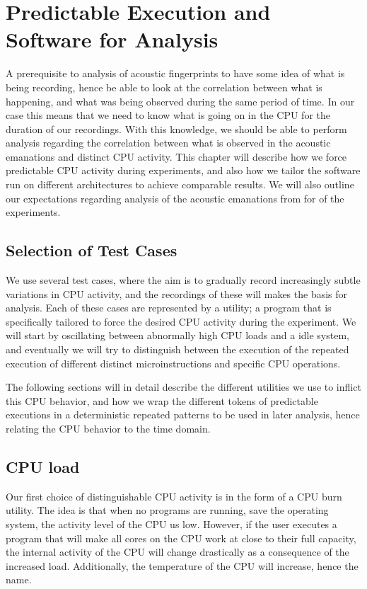 \chapter{Predictable Execution and Software for Analysis}\label{chp4:predictable_execution} 
A prerequisite to analysis of acoustic fingerprints to have some idea of what is being recording, hence be able to look at the correlation between what is happening, and what was being observed during the same period of time.
In our case this means that we need to know what is going on in the CPU for the duration of our recordings.
With this knowledge, we should be able to perform analysis regarding the correlation between what is observed in the acoustic emanations and distinct CPU activity.
This chapter will describe how we force predictable CPU activity during experiments, and also how we tailor the software run on different architectures to achieve comparable results.
We will also outline our expectations regarding analysis of the acoustic emanations from for of the experiments.

\section{Selection of Test Cases}
We use several test cases, where the aim is to gradually record increasingly subtle variations in CPU activity, and the recordings of these will makes the basis for analysis.
Each of these cases are represented by a utility; a program that is specifically tailored to force the desired CPU activity during the experiment.
We will start by oscillating between abnormally high CPU loads and a idle system, and eventually we will try to distinguish between the execution of the repeated execution of different distinct microinstructions and specific CPU operations.

The following sections will in detail describe the different utilities we use to inflict this CPU behavior, and how we wrap the different tokens of predictable executions in a deterministic repeated patterns to be used in later analysis, hence relating the CPU behavior to the time domain. 


\section{CPU load}\label{chp4:sec:cpu_load}
Our first choice of distinguishable CPU activity is in the form of a CPU burn utility. 
The idea is that when no programs are running, save the operating system, the activity level of the CPU us low. 
However, if the user executes a program that will make all cores on the CPU work at close to their full capacity, the internal activity of the CPU will change drastically as a consequence of the increased load.
Additionally, the temperature of the CPU will increase, hence the name.

